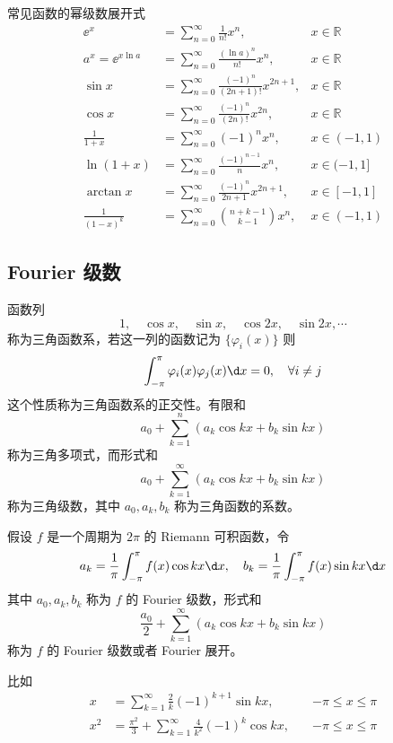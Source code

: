 常见函数的幂级数展开式
\[ \begin{aligned}
		\ee^x              & = \sum_{n=0}^\infty \frac{1}{n!} x^n,                & x \in \mathbb{R} \\
		a^x = \ee^{x\ln a} & = \sum_{n=0}^\infty \frac{(\ln a)^n}{n!} x^n,        & x \in \mathbb{R} \\
		\sin x             & = \sum_{n=0}^\infty \frac{(-1)^n}{(2n+1)!} x^{2n+1}, & x \in \mathbb{R} \\
		\cos x             & = \sum_{n=0}^\infty \frac{(-1)^n}{(2n)!} x^{2n},     & x \in \mathbb{R} \\
		\frac{1}{1+x}      & = \sum_{n=0}^\infty (-1)^n x^{n},                    & x \in (-1, 1)    \\
		\ln(1+x)           & = \sum_{n=0}^\infty \frac{(-1)^{n-1}}{n} x^{n},      & x \in (-1, 1]    \\
		\arctan x          & = \sum_{n=0}^\infty \frac{(-1)^{n}}{2n+1} x^{2n+1},  & x \in [-1, 1]    \\
		\frac{1}{(1-x)^k}  & = \sum_{n=0}^{\infty} \binom{n+k-1}{k-1} x^n,        & x \in (-1,1)
	\end{aligned} \]

\subsection{Fourier 级数}

函数列
\[ 1, \quad \cos x, \quad \sin x, \quad \cos 2x, \quad \sin 2x , \cdots \]
称为三角函数系，若这一列的函数记为 $\{\varphi_i(x)\}$ 则
\[ \int_{-\pi}^{\pi} \varphi_i(x) \varphi_j(x) \d x = 0, \quad \forall i \neq j \]
这个性质称为三角函数系的正交性。有限和
\[ a_0 + \sum_{k=1}^n (a_k \cos kx + b_k \sin kx) \]
称为三角多项式，而形式和
\[ a_0 + \sum_{k=1}^\infty (a_k \cos kx + b_k \sin kx) \]
称为三角级数，其中 $a_0, a_k, b_k$ 称为三角函数的系数。

\begin{definition}[Fourier 级数]
	假设 $f$ 是一个周期为 $2\pi$ 的 Riemann 可积函数，令
	\[ a_k = \frac{1}{\pi} \int_{-\pi}^{\pi} f(x) \cos kx \d x, \quad b_k = \frac{1}{\pi} \int_{-\pi}^{\pi} f(x) \sin k x \d x \]
	其中 $a_0, a_k, b_k$ 称为 $f$ 的 Fourier 级数，形式和
	\[ \frac{a_0}{2} + \sum_{k=1}^\infty (a_k \cos k x+ b_k \sin k x) \]
	称为 $f$ 的 Fourier 级数或者 Fourier 展开。
\end{definition}

比如
\[ \begin{aligned}
		x   & = \sum_{k=1}^{\infty} \frac{2}{k} (-1)^{k+1} \sin k x, \quad                   & -\pi \leqslant x \leqslant \pi \\
		x^2 & = \frac{\pi^2}{3} + \sum_{k=1}^{\infty} \frac{4}{k^2} (-1)^{k} \cos k x, \quad & -\pi \leqslant x \leqslant \pi \\
	\end{aligned} \]

